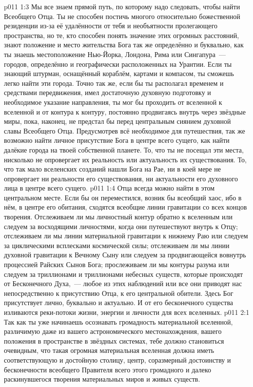 \vs p011 1:3 \pc Мы все знаем прямой путь, по которому надо следовать, чтобы найти Всеобщего Отца. Ты не способен постичь многого относительно божественной резиденции из\hyp{}за её удалённости от тебя и необъятности пролегающего пространства, но те, кто способен понять значение этих огромных расстояний, знают положение и место жительства Бога так же определённо и буквально, как ты знаешь местоположение Нью\hyp{}Йорка, Лондона, Рима или Сингапура~--- городов, определённо и географически расположенных на Урантии. Если ты знающий штурман, оснащённый кораблём, картами и компасом, ты сможешь легко найти эти города. Точно так же, если бы ты располагал временем и средствами передвижения, имел достаточную духовную подготовку и необходимое указание направления, ты мог бы проходить от вселенной к вселенной и от контура к контуру, постоянно продвигаясь внутрь через звёздные миры, пока, наконец, не предстал бы перед центральным сиянием духовной славы Всеобщего Отца. Предусмотрев всё необходимое для путешествия, так же возможно найти личное присутствие Бога в центре всего сущего, как найти далёкие города на твоей собственной планете. То, что ты не посещал эти места, нисколько не опровергает их реальность или актуальность их существования. То, что так мало вселенских созданий нашли Бога на Рае, ни в коей мере не опровергает ни реальности его существования, ни актуальности его духовного лица в центре всего сущего.
\vs p011 1:4 Отца всегда можно найти в этом центральном месте. Если бы он переместился, возник бы всеобщий хаос, ибо в нём, в центре его обитания, сходятся всеобщие линии гравитации со всех концов творения. Отслеживаем ли мы личностный контур обратно к вселенным или следуем за восходящими личностями, когда они путешествуют внутрь к Отцу; отслеживаем ли мы линии материальной гравитации к нижнему Раю или следуем за циклическими всплесками космической силы; отслеживаем ли мы линии духовной гравитации к Вечному Сыну или следуем за продвигающейся вовнутрь процессией Райских Сынов Бога; прослеживаем ли мы контуры разума или следуем за триллионами и триллионами небесных существ, которые происходят от Бесконечного Духа,~--- любое из этих наблюдений или все они приводят нас непосредственно к присутствию Отца, к его центральной обители. Здесь Бог присутствует лично, буквально и актуально. И от его бесконечного существа изливаются реки\hyp{}потоки жизни, энергии и личности для всех вселенных.
\vs p011 2:1 Так как ты уже начинаешь осознавать громадность материальной вселенной, различимую даже из вашего астрономического местонахождения, вашего положения в пространстве в звёздных системах, тебе должно становиться очевидным, что такая огромная материальная вселенная должна иметь соответствующую и достойную столицу, центр, соразмерный достоинству и бесконечности всеобщего Правителя всего этого громадного и далеко раскинувшегося творения материальных миров и живых существ.
